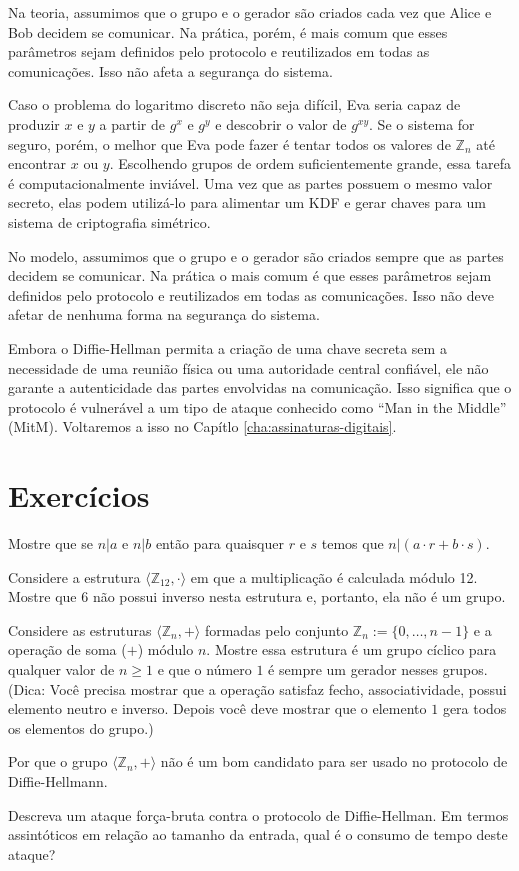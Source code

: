 Na teoria, assumimos que o grupo e o gerador são criados cada vez que Alice e Bob decidem se comunicar.
Na prática, porém, é mais comum que esses parâmetros sejam definidos pelo protocolo e reutilizados em todas as comunicações.
Isso não afeta a segurança do sistema.

Caso o problema do logaritmo discreto não seja difícil, Eva seria capaz de produzir $x$ e $y$ a partir de $g^x$ e $g^y$ e descobrir o valor de $g^{xy}$.
Se o sistema for seguro, porém, o melhor que Eva pode fazer é tentar todos os valores de $\mathbb{Z}_n$ até encontrar $x$ ou $y$.
Escolhendo grupos de ordem suficientemente grande, essa tarefa é computacionalmente inviável.
Uma vez que as partes possuem o mesmo valor secreto, elas podem utilizá-lo para alimentar um KDF e gerar chaves para um sistema de criptografia simétrico.

No modelo, assumimos que o grupo e o gerador são criados sempre que as partes decidem se comunicar.
Na prática o mais comum é que esses parâmetros sejam definidos pelo protocolo e reutilizados em todas as comunicações.
Isso não deve afetar de nenhuma forma na segurança do sistema.

Embora o Diffie-Hellman permita a criação de uma chave secreta sem a necessidade de uma reunião física ou uma autoridade central confiável, ele não garante a autenticidade das partes envolvidas na comunicação.
Isso significa que o protocolo é vulnerável a um tipo de ataque conhecido como ``Man in the Middle'' (MitM).
Voltaremos a isso no Capítlo \ref{cha:assinaturas-digitais}.

\section{Exercícios}

\begin{exercicio}
  Mostre que se $n|a$ e $n|b$ então para quaisquer $r$ e $s$ temos que $n|(a \cdot r + b \cdot s)$.
\end{exercicio}

\begin{exercicio}
\label{ex:grupo}
  Considere a estrutura $\langle \mathbb{Z}_{12}, \cdot \rangle$ em que a multiplicação é calculada módulo 12.
Mostre que $6$ não possui inverso nesta estrutura e, portanto, ela não é um grupo.
\end{exercicio}

\begin{exercicio}
  Considere as estruturas $\langle \mathbb{Z}_n, + \rangle$ formadas pelo conjunto $\mathbb{Z}_n := \{0, \dots, n-1\}$ e a operação de soma ($+$) módulo $n$.
  Mostre essa estrutura é um grupo cíclico para qualquer valor de $n \geq 1$ e que o número $1$ é sempre um gerador nesses grupos. (Dica: Você precisa mostrar que a operação satisfaz fecho, associatividade, possui elemento neutro e inverso. Depois você deve mostrar que o elemento $1$ gera todos os elementos do grupo.)

  Por que o grupo $\langle \mathbb{Z}_n, +\rangle$ não é um bom candidato para ser usado no protocolo de Diffie-Hellmann.
\end{exercicio}

\begin{exercicio}
  Descreva um ataque força-bruta contra o protocolo de Diffie-Hellman.
  Em termos assintóticos em relação ao tamanho da entrada, qual é o consumo de tempo deste ataque?
\end{exercicio}
